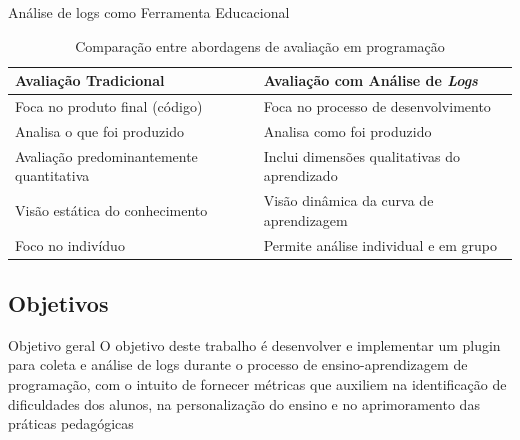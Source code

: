 \documentclass{if-beamer}
\begin{document}
\begin{frame}{Análise de logs como Ferramenta Educacional}
\begin{table}[h]
\centering
\normalsize
\caption{Comparação entre abordagens de avaliação em programação}
\label{tab:comparacao-avaliacao}
\begin{tabular}{p{}p{}}
\hline
\textbf{Avaliação Tradicional} & \textbf{Avaliação com Análise de \textit{Logs}} \\
\hline
Foca no produto final (código) & Foca no processo de desenvolvimento \\
Analisa o que foi produzido & Analisa como foi produzido \\
Avaliação predominantemente quantitativa & Inclui dimensões qualitativas do aprendizado \\
Visão estática do conhecimento & Visão dinâmica da curva de aprendizagem \\
Foco no indivíduo & Permite análise individual e em grupo \\
\hline
\end{tabular}
\end{table}
\end{frame}
%
%
%
%
%
%
%
%

\subsection{Objetivos}
\begin{frame}{Objetivo geral}
\large
    O objetivo deste trabalho é desenvolver e implementar um plugin para coleta e análise de logs durante o processo de ensino-aprendizagem de programação, com o intuito de fornecer métricas que auxiliem na identificação de dificuldades dos alunos, na personalização do ensino e no aprimoramento das práticas pedagógicas

\end{frame}
\end{document}
